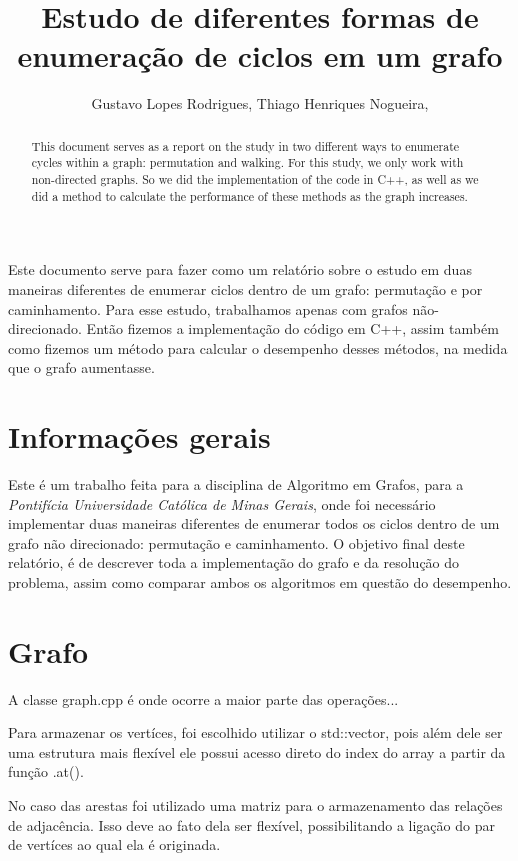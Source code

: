 \documentclass[12pt]{article}
\title{Estudo de diferentes formas de enumeração de ciclos em um grafo}
\author{Gustavo Lopes Rodrigues\inst{1}, Thiago Henriques Nogueira\inst{2},}
\begin{document}
 

\maketitle

\begin{abstract} 
  This document serves as a report on the study in two different ways
  to enumerate cycles within a graph: permutation and walking. For this
  study, we only work with non-directed graphs. So we did the implementation
  of the code in C++, as well as we did a method to calculate the performance of these
  methods as the graph increases.
\end{abstract}

\begin{resumo} 
  Este documento serve para fazer como um relatório sobre o estudo em duas maneiras 
  diferentes de enumerar ciclos dentro de um grafo: permutação e por caminhamento. Para esse 
  estudo, trabalhamos apenas com grafos não-direcionado. Então fizemos a implementação 
  do código em C++, assim também como fizemos um método para calcular o desempenho desses 
  métodos, na medida que o grafo aumentasse.
\end{resumo}


\section{Informações gerais}

  Este é um trabalho feita para a disciplina de Algoritmo em Grafos, para a \emph{Pontifícia Universidade Católica de Minas Gerais},
  onde foi necessário implementar duas maneiras diferentes de enumerar todos os ciclos dentro de um grafo não direcionado: permutação e caminhamento. O objetivo final 
  deste relatório, é de descrever toda a implementação do grafo e da resolução do problema, assim como comparar ambos os algoritmos 
  em questão do desempenho.

  \section{Grafo}

  A classe graph.cpp é onde ocorre a maior parte das operações...
  
  Para armazenar os vertíces, foi escolhido utilizar o std::vector, pois além dele ser uma estrutura mais 
  flexível ele possui acesso direto do index do array a partir da função .at().

  No caso das arestas foi utilizado uma matriz para o armazenamento das relações de adjacência. Isso deve 
  ao fato dela ser flexível, possibilitando a ligação do par de vertíces ao qual ela é originada.
\end{document}
